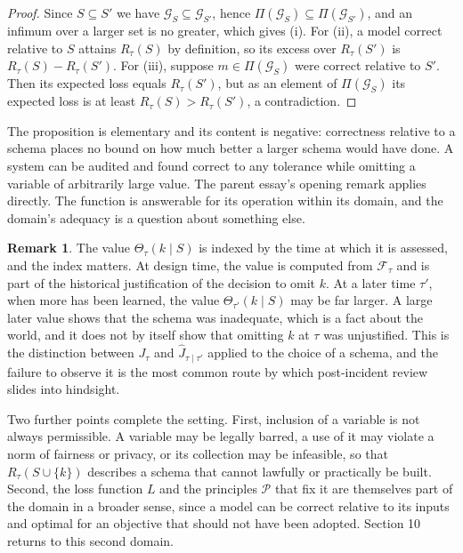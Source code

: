 \documentclass[11pt]{article}
\newcommand{\F}{\mathcal F}
\newcommand{\G}{\mathcal G}
\newcommand{\Th}{\Theta}
\theoremstyle{plain}
\theoremstyle{definition}
\newtheorem{remark}{Remark}
\begin{document}
\begin{proof}
Since $S\subseteq S'$ we have $\G_S\subseteq\G_{S'}$, hence $\Pi(\G_S)\subseteq\Pi(\G_{S'})$, and an infimum over a larger set is no greater, which gives (i). For (ii), a model correct relative to $S$ attains $R_\tau(S)$ by definition, so its excess over $R_\tau(S')$ is $R_\tau(S)-R_\tau(S')$. For (iii), suppose $m\in\Pi(\G_S)$ were correct relative to $S'$. Then its expected loss equals $R_\tau(S')$, but as an element of $\Pi(\G_S)$ its expected loss is at least $R_\tau(S)>R_\tau(S')$, a contradiction.
\end{proof}

The proposition is elementary and its content is negative: correctness relative to a schema places no bound on how much better a larger schema would have done. A system can be audited and found correct to any tolerance while omitting a variable of arbitrarily large value. The parent essay's opening remark applies directly. The function is answerable for its operation within its domain, and the domain's adequacy is a question about something else.

\begin{remark}
The value $\Th_\tau(k\mid S)$ is indexed by the time at which it is assessed, and the index matters. At design time, the value is computed from $\F_\tau$ and is part of the historical justification of the decision to omit $k$. At a later time $\tau'$, when more has been learned, the value $\Th_{\tau'}(k\mid S)$ may be far larger. A large later value shows that the schema was inadequate, which is a fact about the world, and it does not by itself show that omitting $k$ at $\tau$ was unjustified. This is the distinction between $J_\tau$ and $\widehat J_{\tau\mid\tau'}$ applied to the choice of a schema, and the failure to observe it is the most common route by which post-incident review slides into hindsight.
\end{remark}

Two further points complete the setting. First, inclusion of a variable is not always permissible. A variable may be legally barred, a use of it may violate a norm of fairness or privacy, or its collection may be infeasible, so that $R_\tau(S\cup\{k\})$ describes a schema that cannot lawfully or practically be built. Second, the loss function $L$ and the principles $\mathcal P$ that fix it are themselves part of the domain in a broader sense, since a model can be correct relative to its inputs and optimal for an objective that should not have been adopted. Section 10 returns to this second domain.
\end{document}
